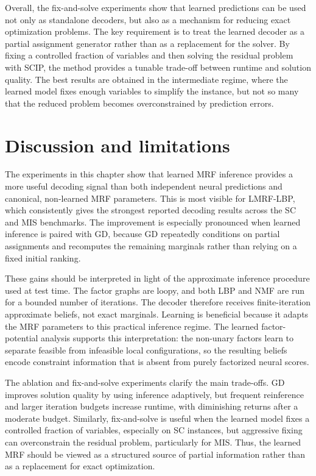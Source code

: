 Overall, the fix-and-solve experiments show that learned predictions can be used not only as standalone decoders, but also as a mechanism for reducing exact optimization problems. The key requirement is to treat the learned decoder as a partial assignment generator rather than as a replacement for the solver. By fixing a controlled fraction of variables and then solving the residual problem with SCIP, the method provides a tunable trade-off between runtime and solution quality. The best results are obtained in the intermediate regime, where the learned model fixes enough variables to simplify the instance, but not so many that the reduced problem becomes overconstrained by prediction errors.

\section{Discussion and limitations}

The experiments in this chapter show that learned MRF inference provides a more useful decoding signal than both independent neural predictions and canonical, non-learned MRF parameters. This is most visible for LMRF-LBP, which consistently gives the strongest reported decoding results across the SC and MIS benchmarks. The improvement is especially pronounced when learned inference is paired with GD, because GD repeatedly conditions on partial assignments and recomputes the remaining marginals rather than relying on a fixed initial ranking.

These gains should be interpreted in light of the approximate inference procedure used at test time. The factor graphs are loopy, and both LBP and NMF are run for a bounded number of iterations. The decoder therefore receives finite-iteration approximate beliefs, not exact marginals. Learning is beneficial because it adapts the MRF parameters to this practical inference regime. The learned factor-potential analysis supports this interpretation: the non-unary factors learn to separate feasible from infeasible local configurations, so the resulting beliefs encode constraint information that is absent from purely factorized neural scores.

The ablation and fix-and-solve experiments clarify the main trade-offs. GD improves solution quality by using inference adaptively, but frequent reinference and larger iteration budgets increase runtime, with diminishing returns after a moderate budget. Similarly, fix-and-solve is useful when the learned model fixes a controlled fraction of variables, especially on SC instances, but aggressive fixing can overconstrain the residual problem, particularly for MIS. Thus, the learned MRF should be viewed as a structured source of partial information rather than as a replacement for exact optimization.

